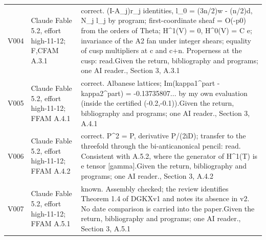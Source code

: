 \documentclass[11pt,a4paper]{article}
\theoremstyle{plain}
\theoremstyle{definition}
\begin{document}
\begin{longtable}{@{}L{.08\linewidth}L{.31\linewidth}L{.56\linewidth}@{}}
V004 & Claude Fable 5.2, effort high-11-12; F,C\newline FAM A.3.1 & correct. (I-A\_\allowbreak{}j)r\_\allowbreak{}j identities, l\_\allowbreak{}0 = (3n/\allowbreak{}2)w - (n/\allowbreak{}2)d, N\_\allowbreak{}j l\_\allowbreak{}j by program; first-coordinate sheaf = O(-p0) from the orders of Theta; H\textasciicircum{}1(V) = 0, H\textasciicircum{}0(V) = C e; invariance of the A2 fan under integer shears; equality of cusp multipliers at c and c+n. Properness at the cusp:\allowbreak{} read.\newline Given the return, bibliography and programs; one AI reader.\newline {}, Section 3, A.3.1\\
V005 & Claude Fable 5.2, effort high-11-12; F\newline FAM A.4.1 & correct. Albanese lattices; Im(kappa1\textasciicircum{}part - kappa2\textasciicircum{}part) = -0.13735807... by my own evaluation (inside the certified (-0.2,-0.1)).\newline Given the return, bibliography and programs; one AI reader.\newline {}, Section 3, A.4.1\\
V006 & Claude Fable 5.2, effort high-11-12; F\newline FAM A.4.2 & correct. P\textasciicircum{}2 = P, derivative P/\allowbreak{}(2iD); transfer to the threefold through the bi-anticanonical pencil:\allowbreak{} read. Consistent with A.5.2, where the generator of H\textasciicircum{}1(T) is e tensor [gamma].\newline Given the return, bibliography and programs; one AI reader.\newline {}, Section 3, A.4.2\\
V007 & Claude Fable 5.2, effort high-11-12; F\newline FAM A.5.1 & known. Assembly checked; the review identifies Theorem 1.4 of DGKXv1 and notes its absence in v2. No date comparison is carried into the paper.\newline Given the return, bibliography and programs; one AI reader.\newline {}, Section 3, A.5.1\\

\end{longtable}
\end{document}
